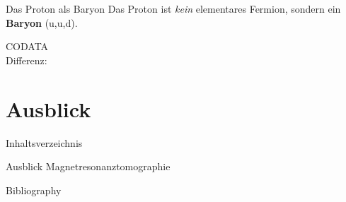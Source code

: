 \documentclass[t,9pt]{beamer}
\begin{document}
        \begin{frame}{Das Proton als Baryon}
                \pause
                Das Proton ist \textit{kein} elementares Fermion, sondern ein \textbf{Baryon} (u,u,d).
                \pause
                \begin{center}
                \end{center}
                \tiny\vspace{-.2cm}\hspace{8.8cm}CODATA\cite{CODATA_proton_magneton}\normalsize
                \pause
                \\ Differenz: 
                \begin{center}
                \end{center}
        \end{frame}

        \section{Ausblick}

        \begin{frame}{Inhaltsverzeichnis}
                \tableofcontents[currentsection]
        \end{frame}

        \begin{frame}{Ausblick}
                \pause
                Magnetresonanztomographie        
        \end{frame}

        \begin{frame}{Bibliography}
                \tiny
                
                
        \end{frame}
                
\end{document}
